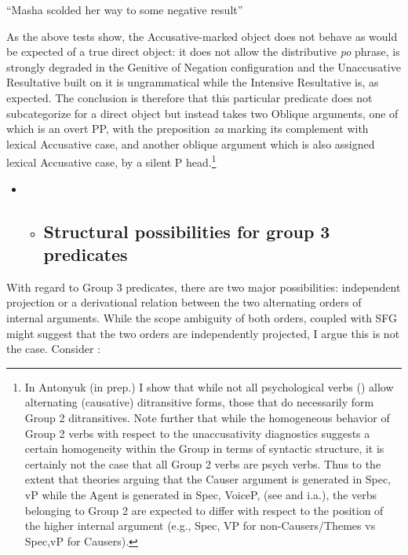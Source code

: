\documentclass[output=paper,modfonts, nonflat]{langsci/langscibook}
\begin{document}
\begin{styleinnerExample}
    “Masha scolded her way to some negative result”
\end{styleinnerExample}

As the above tests show, the Accusative-marked object does not behave as would be expected of a true direct object: it does not allow the distributive \textit{po} phrase, is strongly degraded in the Genitive of Negation configuration and the Unaccusative Resultative built on it is ungrammatical while the Intensive Resultative is, as expected. The conclusion is therefore that this particular predicate does not subcategorize for a direct object but instead takes two Oblique arguments, one of which is an overt PP, with the preposition \textit{za} marking its complement with lexical Accusative case, and another oblique argument which is also assigned lexical Accusative case, by a silent P head.\footnote{In Antonyuk (in prep.) I show that while not all psychological verbs (\citealt{BellettiRizzi1988}) allow alternating (causative) ditransitive forms, those that do necessarily form Group 2 ditransitives. Note further that while the homogeneous behavior of Group 2 verbs with respect to the unaccusativity diagnostics suggests a certain homogeneity within the Group in terms of syntactic structure, it is certainly not the case that all Group 2 verbs are psych verbs. Thus to the extent that theories arguing that the Causer argument is generated in Spec, vP while the Agent is generated in Spec, VoiceP, (see \citealt{Kratzer2005} and \citealt{AlexiadouEtAl2006} i.a.), the verbs belonging to Group 2 are expected to differ with respect to the position of the higher internal argument (e.g., Spec, VP for non-Causers/Themes vs Spec,vP for Causers).}

\begin{itemize}
\item \begin{itemize}
\item \subsection{Structural possibilities for group 3 predicates}
\end{itemize}
\end{itemize}

With regard to Group 3 predicates, there are two major possibilities: independent projection or a derivational relation between the two alternating orders of internal arguments. While the scope ambiguity of both orders, coupled with SFG might suggest that the two orders are independently projected, I argue this is not the case. Consider :
\end{document}
